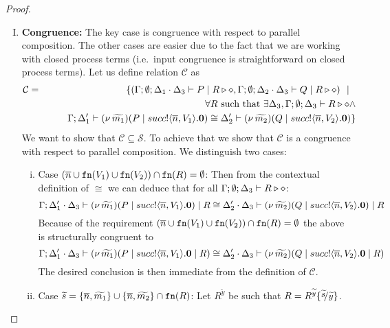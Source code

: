 \begin{proof}
\begin{enumerate}[I.]
		\item	{\bf Congruence:}
				The key case is congruence with respect to parallel composition.
				The other cases are easier due to the fact that we are
				working with closed process terms
				(i.e.~input congruence is straightforward on closed process terms).
				Let us define relation $\mathcal{C}$ as
				\begin{eqnarray*}
					\mathcal{C} &=&
					\{	(\Gamma; \emptyset; \Delta_1 \cdot \Delta_3 \vdash P \;|\; R \triangleright \diamond,
							\Gamma; \emptyset; \Delta_2 \cdot \Delta_3 \vdash Q \;|\; R \triangleright \diamond) \ \ |\ \ 
					\\
					& &	\qquad \forall R \textrm{ such that } \exists \Delta_3, \Gamma;\emptyset; \Delta_3 \vdash R \triangleright \diamond \land\\
					& &	\qquad \Gamma; \Delta_1' \vdash (\nu\, \widetilde{m_1})(P \;|\; succ ! \langle \overline{n}, V_1 \rangle . \mathbf{0}) \cong \Delta_2' \vdash (\nu\, \widetilde{m_2})(Q \;|\; succ ! \langle \overline{n}, V_2 \rangle . \mathbf{0})\}
				\end{eqnarray*}
				We want to show that $\mathcal{C} \subseteq \mathcal{S}$.
				To achieve that we show that $\mathcal{C}$ is a congruence with respect to parallel composition.
				We distinguish two cases:
				\begin{enumerate}[i)]
					\item	Case $(\overline{n} \cup \mathtt{fn}(V_1) \cup \mathtt{fn}(V_2)) \cap \mathtt{fn}(R) = \emptyset$: Then
from the contextual definition of $\cong$ we can deduce that
							 for all $\Gamma; \emptyset; \Delta_3 \vdash R \triangleright \diamond$:
							\[
								\Gamma; \Delta_1' \cdot \Delta_3 \vdash (\nu\, \widetilde{m_1})(P \;|\; succ ! \langle \overline{n}, V_1 \rangle . \mathbf{0}) \;|\; R \cong \Delta_2' \cdot \Delta_3 \vdash (\nu\, \widetilde{m_2})(Q \;|\; succ ! \langle \overline{n}, V_2 \rangle . \mathbf{0}) \;|\; R
							\]
							Because of the requirement
							$(\overline{n} \cup \mathtt{fn}(V_1) \cup \mathtt{fn}(V_2)) \cap \mathtt{fn}(R) = \emptyset$
							the above is structurally congruent to
							\[
								\Gamma; \Delta_1' \cdot \Delta_3 \vdash (\nu\, \widetilde{m_1})(P \;|\; succ ! \langle \overline{n}, V_1 \rangle . \mathbf{0} \;|\; R) \cong \Delta_2' \cdot \Delta_3 \vdash (\nu\, \widetilde{m_2})(Q \;|\; succ ! \langle \overline{n}, V_2 \rangle . \mathbf{0} \;|\; R)
							\]
							The desired conclusion is then immediate from 
							 the definition of $\mathcal{C}$.

					\item	%
							Case $\widetilde{s} = \{\overline{n}, \widetilde{m_1}\} \cup \{\overline{n}, \widetilde{m_2}\} \cap \mathtt{fn}(R)$:
							Let $R^{\widetilde{y}}$ be such that $R = R^{\widetilde{y}}\subst{\widetilde{s}}{\widetilde{y}}$.



\end{enumerate}
\end{enumerate}
\end{proof}
